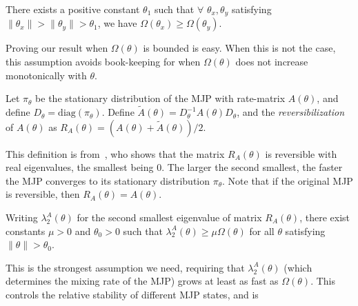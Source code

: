 \begin{assumption}
  There exists a positive constant $\theta_1$ such that $\forall$ $\theta_x, \theta_y$ satisfying
  $\| \theta_x \| > \| \theta_y \| > \theta_1$, we
  have $\Omega(\theta_x) \ge \Omega(\theta_y)$.
  \label{asmp:mono_tail}
\end{assumption}
\noindent Proving our result when $\Omega(\theta)$ is bounded is 
easy. %
When this is not the case, this assumption avoids book-keeping for 
when $\Omega(\theta)$ does not increase monotonically with $\theta$.

\begin{definition}
Let $\pi_\theta$ be the stationary distribution of the MJP with rate-matrix 
$A(\theta)$, and define $D_\theta = \text{diag}(\pi_\theta)$. Define 
$\tilde{A}(\theta) = D_\theta^{-1}A(\theta)D_\theta$, and the 
{\em reversibilization} of $A(\theta)$ as $R_A(\theta) = 
(A(\theta)+\tilde{A}(\theta))/2$. 
\label{def:mjp_symm}
\end{definition}
This definition is from~\cite{fill1991}, who shows that the matrix 
$R_A(\theta)$ is reversible with real eigenvalues, the smallest being $0$. 
The larger the second smallest, the faster the MJP converges to its 
stationary distribution $\pi_\theta$.
Note that if the original MJP is reversible, then $R_A(\theta) = A(\theta)$.
\begin{assumption}
	Writing $\lambda ^A_2(\theta)$ for the second smallest eigenvalue of
    matrix  $R_A(\theta)$, there exist constants $\mu > 0$ and $\theta_0 > 0$
    such that $ \lambda ^A_2(\theta) \geq \mu \Omega(\theta)$
   for all $\theta$ satisfying $ \| \theta \|> \theta_0$.
  \label{asmp:cond_num}
\end{assumption} 
\noindent %
This is the strongest assumption we need, requiring that 
$\lambda^A_2(\theta)$ (which determines the mixing rate of the MJP) grows 
at least as fast as $\Omega(\theta)$. 
This controls the relative stability of different MJP states, and is 
